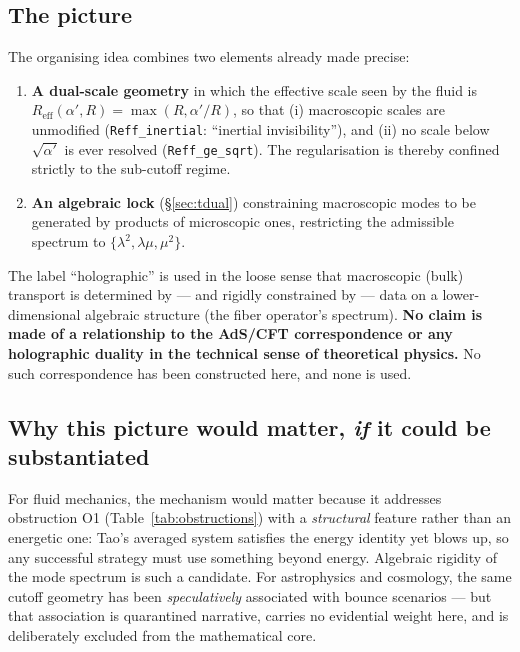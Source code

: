 \documentclass[11pt,a4paper]{article}
\newcommand{\Reff}{R_{\mathrm{eff}}}
\theoremstyle{definition}
\theoremstyle{plain}
\begin{document}
\subsection{The picture}

The organising idea combines two elements already made precise:

\begin{enumerate}[leftmargin=*]
\item \textbf{A dual-scale geometry} in which the effective scale seen by the fluid is
$\Reff(\alpha',R)=\max(R,\alpha'/R)$, so that (i) macroscopic scales are unmodified
(\texttt{Reff\_inertial}: ``inertial invisibility''), and (ii) no scale below $\sqrt{\alpha'}$
is ever resolved (\texttt{Reff\_ge\_sqrt}). The regularisation is thereby confined strictly to
the sub-cutoff regime.
\item \textbf{An algebraic lock} (\S\ref{sec:tdual}) constraining macroscopic modes to be
generated by products of microscopic ones, restricting the admissible spectrum to
$\{\lambda^2,\lambda\mu,\mu^2\}$.
\end{enumerate}

The label ``holographic'' is used in the loose sense that macroscopic (bulk) transport is
determined by --- and rigidly constrained by --- data on a lower-dimensional algebraic
structure (the fiber operator's spectrum). \textbf{No claim is made of a relationship to the
AdS/CFT correspondence or any holographic duality in the technical sense of theoretical
physics.} No such correspondence has been constructed here, and none is used.

\subsection{Why this picture would matter, \emph{if} it could be substantiated}

For fluid mechanics, the mechanism would matter because it addresses obstruction O1
(Table~\ref{tab:obstructions}) with a \emph{structural} feature rather than an energetic one:
Tao's averaged system satisfies the energy identity yet blows up, so any successful strategy
must use something beyond energy. Algebraic rigidity of the mode spectrum is such a candidate.
For astrophysics and cosmology, the same cutoff geometry has been \emph{speculatively}
associated with bounce scenarios --- but that association is quarantined narrative, carries no
evidential weight here, and is deliberately excluded from the mathematical core.
\end{document}

